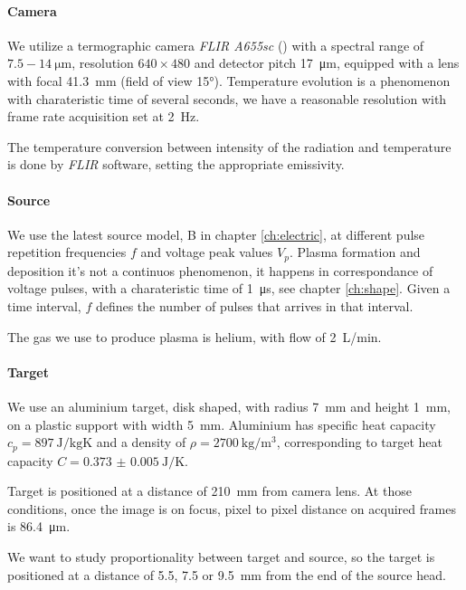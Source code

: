 \paragraph{Camera}
We utilize a termographic camera \emph{FLIR A655sc} (\cite{flircamera}) with a spectral range of $\num{7.5}-\SI{14}{\micro\meter}$, resolution $\num{640}\times\num{480}$ and detector pitch \SI{17}{\micro\meter}, equipped with a lens with focal \SI{41.3}{\milli\meter} (field of view \ang{15}).
Temperature evolution is a phenomenon with charateristic time of several seconds, we have a reasonable resolution with frame rate acquisition set at \SI{2}{\hertz}.

The temperature conversion between intensity of the radiation and temperature is done by \emph{FLIR} software, setting the appropriate emissivity.

\paragraph{Source}
We use the latest source model, B in chapter \ref{ch:electric}, at different pulse repetition frequencies $f$ and voltage peak values $V_p$. Plasma formation and deposition it's not a continuos phenomenon, it happens in correspondance of voltage pulses, with a charateristic time of \SI{1}{\micro\second}, see chapter \ref{ch:shape}. Given a time interval, $f$ defines the number of pulses that arrives in that interval.

The gas we use to produce plasma is helium, with flow of \SI{2}{\liter/\minute}.

\paragraph{Target}
We use an aluminium target, disk shaped, with radius \SI{7}{\milli\meter} and height \SI{1}{\milli\meter}, on a plastic support with width \SI{5}{\milli\meter}.
Aluminium has specific heat capacity $c_p = \SI{897}{\joule/\kilogram\kelvin}$ and a density of $\rho = \SI{2700}{\kilogram/\meter^3}$, corresponding to target heat capacity $C = \SI{0.373(5)}{\joule/\kelvin}$.

Target is positioned at a distance of \SI{210}{\milli\meter} from camera lens. At those conditions, once the image is on focus, pixel to pixel distance on acquired frames is \SI{86.4}{\micro\meter}.

We want to study proportionality between target and source, so the target is positioned at a distance of \num{5.5}, \num{7.5} or \SI{9.5}{\milli\meter} from the end of the source head.


